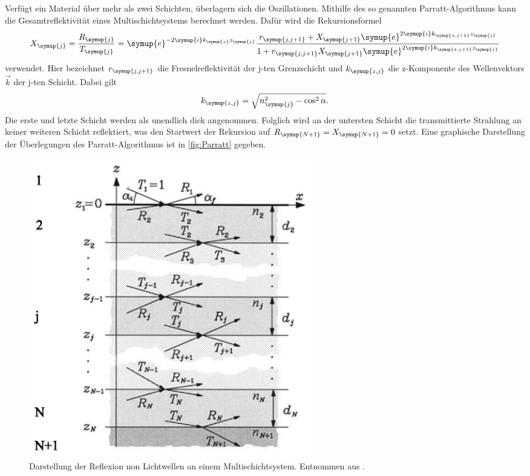 Verfügt ein Material über mehr als zwei Schichten, überlagern sich die Oszillationen. Mithilfe des so genannten Parratt-Algorithmus kann die Gesamtreflektivität eines Multischichtsystems berechnet werden.
Dafür wird die Rekursionsformel
\begin{equation}
    X_{\symup{j}} = \frac{R_{\symup{j}}}{T_{\symup{j}}} = \symup{e}^{-2\symup{i}k_{\symup{z}}z_{\symup{j}}}\frac{r_{\symup{j,j+1}}+X_{\symup{j+1}}\symup{e}^{2\symup{i}k_{\symup{z,j+1}}z_{\symup{j}}}}%
    {1+r_{\symup{j,j+1}}X_{\symup{j+1}}\symup{e}^{2\symup{i}k_{\symup{z,j+1}}z_{\symup{j}}}} %
    \label{eq:Parrat}
\end{equation}
verwendet. Hier bezeichnet $r_{\symup{j,j+1}}$ die Fresnelreflektivität der j-ten Grenzschicht und $k_{\symup{z,j}}$ die z-Komponente des Wellenvektors $\vec{k}$ der j-ten Schicht.
Dabei gilt
\begin{equation*}
    k_{\symup{z,j}} = \sqrt{n_{\symup{j}}^2 -\cos^2 \alpha}.
\end{equation*}
Die erste und letzte Schicht werden als unendlich dick angenommen. Folglich wird an der untersten Schicht die transmittierte Strahlung an keiner weiteren Schicht reflektiert, was den Startwert der Rekursion auf $R_{\symup{N+1}} = X_{\symup{N+1}} = 0$ setzt.
Eine graphische Darstellung der Überlegungen des Parratt-Algorithmus ist in \autoref{fig:Parratt} gegeben.
\begin{figure}
    \centering
    \includegraphics[width=0.6\textwidth]{content/pics/Parratt.png}
    \caption{Darstellung der Reflexion non Lichtwellen an einem Multischichtsystem. Entnommen aus \cite{Tolan1999}.}
    \label{fig:Parratt}
\end{figure}

